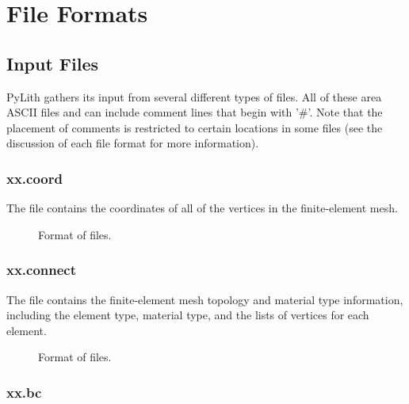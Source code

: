 \chapter{File Formats}

\section{Input Files}

PyLith gathers its input from several different types of files. All of
these area ASCII files and can include comment lines that begin with
'\#'. Note that the placement of comments is restricted to certain
locations in some files (see the discussion of each file format for
more information).


\subsection{xx.coord}

The  file contains the coordinates of all of the
vertices in the finite-element mesh.

\begin{figure}[htbp]
  \begin{center}
    
    \caption{Format of  files.}
  \end{center}
\end{figure}

\subsection{xx.connect}

The  file contains the finite-element mesh
topology and material type information, including the element type,
material type, and the lists of vertices for each element.

\begin{figure}[htbp]
  \begin{center}
    
    \caption{Format of  files.}
  \end{center}
\end{figure}  

\subsection{xx.bc}

